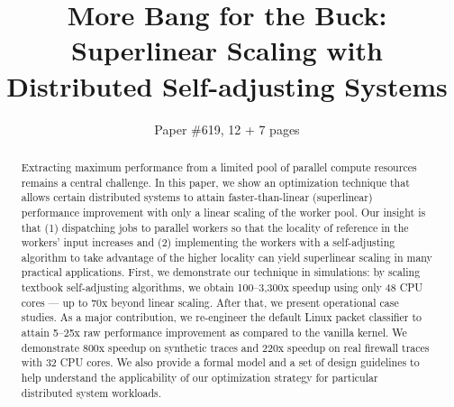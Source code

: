 \documentclass[letterpaper,twocolumn,10pt]{article}
\begin{document}


\title{More Bang for the Buck: 
Superlinear Scaling with Distributed Self-adjusting Systems}

\author{Paper \#619, 12 + 7 pages}

\maketitle

\begin{abstract}
  Extracting maximum performance from a limited pool of parallel compute resources remains a central challenge.  In this paper, we show an optimization technique that allows certain distributed systems to attain faster-than-linear (superlinear) performance improvement with only a linear scaling of the worker pool. Our insight is that (1) dispatching jobs to parallel workers so that the locality of reference in the workers' input increases and (2) implementing the workers with a self-adjusting algorithm to take advantage of the higher locality can yield superlinear scaling in many practical applications. First, we demonstrate our technique in simulations: by scaling textbook self-adjusting algorithms, we obtain 100--3,300x speedup using only 48 CPU cores --- up to 70x beyond linear scaling. After that, we present operational case studies. As a major contribution, we re-engineer the default Linux packet classifier to attain 5--25x raw performance improvement as compared to the vanilla kernel. We demonstrate 800x speedup on synthetic traces and 220x speedup on real firewall traces with 32 CPU cores. We also provide a formal model and a set of design guidelines to help understand the applicability of our optimization strategy for particular distributed system workloads.
\end{abstract}




  
\end{document}
